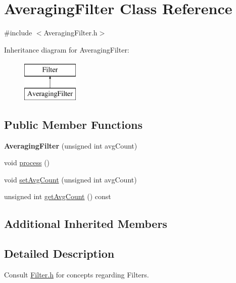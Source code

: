 \hypertarget{class_averaging_filter}{\section{Averaging\+Filter Class Reference}
\label{class_averaging_filter}
}


{\ttfamily \#include $<$Averaging\+Filter.\+h$>$}

Inheritance diagram for Averaging\+Filter\+:\begin{figure}[H]
\begin{center}
\leavevmode
\includegraphics[height=2.000000cm]{class_averaging_filter}
\end{center}
\end{figure}
\subsection*{Public Member Functions}
\begin{DoxyCompactItemize}
\item 
\hypertarget{class_averaging_filter_a8bd3b360c8d4fbd47a7a719479c07942}{{\bfseries Averaging\+Filter} (unsigned int avg\+Count)}\label{class_averaging_filter_a8bd3b360c8d4fbd47a7a719479c07942}

\item 
void \hyperlink{class_averaging_filter_accbc49506bc0c215ee8cb89b2a8b05f7}{process} ()
\item 
void \hyperlink{class_averaging_filter_ab945faa181f4fbacd5690136b86683d7}{set\+Avg\+Count} (unsigned int avg\+Count)
\item 
unsigned int \hyperlink{class_averaging_filter_a41cf584c7e71f657edce9e26286a5dac}{get\+Avg\+Count} () const 
\end{DoxyCompactItemize}
\subsection*{Additional Inherited Members}


\subsection{Detailed Description}
Consult \hyperlink{_filter_8h_source}{Filter.\+h} for concepts regarding Filters.

